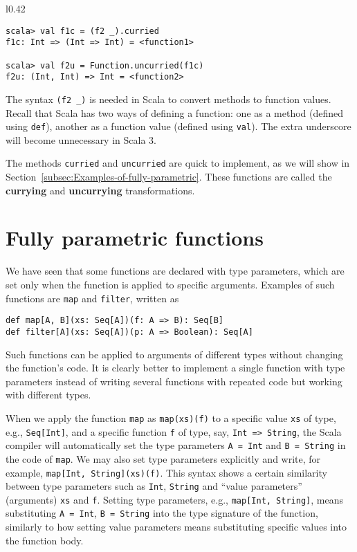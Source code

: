 \begin{wrapfigure}{l}{0.42\columnwidth}%
\vspace{-0.9\baselineskip}
\begin{lstlisting}
scala> val f1c = (f2 _).curried
f1c: Int => (Int => Int) = <function1>

scala> val f2u = Function.uncurried(f1c)
f2u: (Int, Int) => Int = <function2> 
\end{lstlisting}
\vspace{-0.95\baselineskip}
\end{wrapfigure}%

\noindent The syntax \lstinline!(f2 _)! is needed in Scala to convert
methods to function values. Recall that Scala has two ways of defining
a function: one as a method (defined using \lstinline!def!),
another as a function value (defined using
\lstinline!val!). The extra underscore will become unnecessary in
Scala 3.

The methods \lstinline!curried! and \lstinline!uncurried! are quick
to implement, as we will show in Section~\ref{subsec:Examples-of-fully-parametric}.
These functions are called the \textbf{currying}
and \textbf{uncurrying} transformations.

\section{Fully parametric functions\label{sec:Fully-parametric-functions}}

We have seen that some functions are declared with type parameters,
which are set only when the function is applied to specific arguments.
Examples of such functions are \lstinline!map! and \lstinline!filter!,
written as
\begin{lstlisting}
def map[A, B](xs: Seq[A])(f: A => B): Seq[B]
def filter[A](xs: Seq[A])(p: A => Boolean): Seq[A]
\end{lstlisting}
Such functions can be applied to arguments of different types without
changing the function\textsf{'}s code. It is clearly better to implement a
single function with type parameters instead of writing several functions
with repeated code but working with different types.

When we apply the function \lstinline!map! as \lstinline!map(xs)(f)!
to a specific value \lstinline!xs! of type, e.g., \lstinline!Seq[Int]!,
and a specific function \lstinline!f! of type, say, \lstinline!Int => String!,
the Scala compiler will automatically set the type parameters \lstinline!A = Int!
and \lstinline!B = String! in the code of \lstinline!map!. We may
also set type parameters explicitly and write, for example, \lstinline!map[Int, String](xs)(f)!.
This syntax shows a certain similarity between type parameters such
as \lstinline!Int!, \lstinline!String! and \textsf{``}value parameters\textsf{''}
(arguments) \lstinline!xs! and \lstinline!f!. Setting type parameters,
e.g., \lstinline!map[Int, String]!, means substituting \lstinline!A = Int!,
\lstinline!B = String! into the type signature of the function, similarly
to how setting value parameters means substituting specific values
into the function body.

